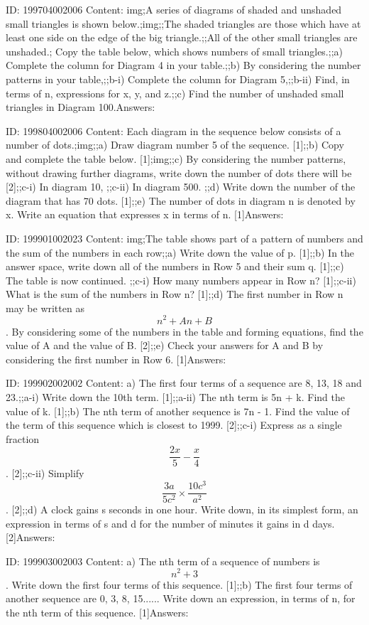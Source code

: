 \documentclass{article}
\begin{document}
ID: 199704002006
Content:
img;A series of diagrams of shaded and unshaded small triangles is shown below.;img;;The shaded triangles are those which have at least one side on the edge of the big triangle.;;All of the other small triangles are unshaded.; Copy the table below, which shows numbers of small triangles.;;a) Complete the column for Diagram 4 in your table.;;b) By considering the number patterns in your table,;;b-i) Complete the column for Diagram 5,;;b-ii) Find, in terms of n, expressions for x, y, and z.;;c) Find the number of unshaded small triangles in Diagram 100.Answers:

ID: 199804002006
Content:
Each diagram in the sequence below consists of a number of dots.;img;;a) Draw diagram number 5 of the sequence. [1];;b) Copy and complete the table below. [1];img;;c) By considering the number patterns, without drawing further diagrams, write down the number of dots there will be [2];;c-i) In diagram 10, ;;c-ii) In diagram 500. ;;d) Write down the number of the diagram that has 70 dots. [1];;e) The number of dots in diagram n is denoted by x. Write an equation that expresses x in terms of n. [1]Answers:

ID: 199901002023
Content:
img;The table shows part of a pattern of numbers and the sum of the numbers in each row;;a) Write down the value of p. [1];;b) In the answer space, write down all of the numbers in Row 5 and their sum q. [1];;c) The table is now continued. ;;c-i) How many numbers appear in Row n? [1];;c-ii) What is the sum of the numbers in Row n? [1];;d) The first number in Row n may be written as $$n^{2} +An+B$$. By considering some of the numbers in the table and forming equations, find the value of A and the value of B. [2];;e) Check your answers for A and B by considering the first number in Row 6. [1]Answers:

ID: 199902002002
Content:
a) The first four terms of a sequence are 8, 13, 18 and 23.;;a-i) Write down the 10th term. [1];;a-ii) The nth term is 5n + k. Find the value of k. [1];;b) The nth term of another sequence is 7n - 1. Find the value of the term of this sequence which is closest to 1999. [2];;c-i) Express as a single fraction $$\frac{2x}{5}-\frac{x}{4}$$. [2];;c-ii) Simplify $$\frac{3a}{5c^{2}} \times \frac{10c^{3}}{a^{2}}$$. [2];;d) A clock gains s seconds in one hour. Write down, in its simplest form, an expression in terms of s and d for the number of minutes it gains in d days. [2]Answers:

ID: 199903002003
Content:
a) The nth term of a sequence of numbers is $$n^2 + 3$$. Write down the first four terms of this sequence. [1];;b) The first four terms of another sequence are 0, 3, 8, 15...... Write down an expression, in terms of n, for the nth term of this sequence. [1]Answers:
\end{document}
